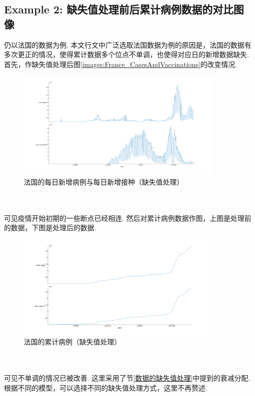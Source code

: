 \documentclass[a4paper, titlepage]{article}
\begin{document}
    \subsection{Example 2: 缺失值处理前后累计病例数据的对比图像}
        仍以法国的数据为例. {\kaishu 本文行文中广泛选取法国数据为例的原因是，法国的数据有多次更正的情况，使得累计数据多个位点不单调，也使得对应日的新增数据缺失.}首先，作缺失值处理后图\ref{images:France_CasesAndVaccinations}的改变情况.\\
        \begin{minipage}{\textwidth}
            \begin{figure}[H]
                \centering
                \includegraphics[width=0.9\textwidth]{./images/France_CasesAndVaccinations_2.png}
                \vspace{-1.5em}
                \caption{法国的每日新增病例与每日新增接种（缺失值处理）}
                \label{images:France_CasesAndVaccinations_2}
            \end{figure}
        \end{minipage}\\\quad\\
        可见疫情开始初期的一些断点已经相连. 然后对累计病例数据作图，上图是处理前的数据，下图是处理后的数据.\\
        \begin{minipage}{\textwidth}
            \begin{figure}[H]
                \centering
                \includegraphics[width=0.88\textwidth]{./images/France_TotalCases.png}
                \vspace{-1.5em}
                \caption{法国的累计病例（缺失值处理）}
                \label{images:France_TotalCases}
            \end{figure}
        \end{minipage}\\\quad\\
        可见不单调的情况已被改善. 这里采用了节\ref{数据的缺失值处理}中提到的衰减分配. 根据不同的模型，可以选择不同的缺失值处理方式，这里不再赘述.
\end{document}
